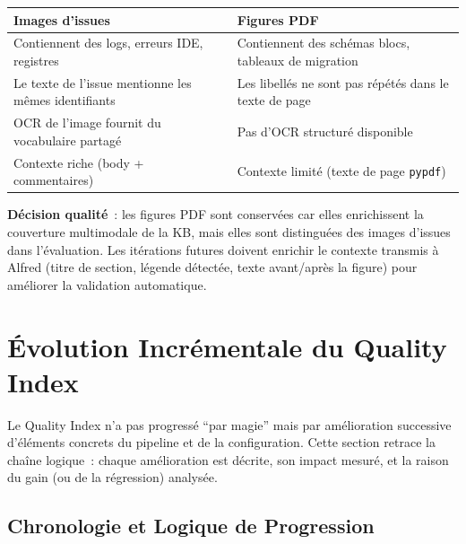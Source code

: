 \begin{longtable}{p{5.5cm}p{7cm}}
\toprule
\textbf{Images d'issues} & \textbf{Figures PDF} \\
\midrule
Contiennent des logs, erreurs IDE, registres & Contiennent des schémas blocs, tableaux de migration \\
Le texte de l'issue mentionne les mêmes identifiants & Les libellés ne sont pas répétés dans le texte de page \\
OCR de l'image fournit du vocabulaire partagé & Pas d'OCR structuré disponible \\
Contexte riche (body + commentaires) & Contexte limité (texte de page \texttt{pypdf}) \\
\bottomrule
\end{longtable}

\textbf{Décision qualité}~: les figures PDF sont conservées car elles enrichissent la couverture multimodale de la KB, mais elles sont distinguées des images d'issues dans l'évaluation. Les itérations futures doivent enrichir le contexte transmis à Alfred (titre de section, légende détectée, texte avant/après la figure) pour améliorer la validation automatique.

\section{Évolution Incrémentale du Quality Index}
\label{sec:evolution_incrementale}

Le Quality Index n'a pas progressé ``par magie'' mais par amélioration successive d'éléments concrets du pipeline et de la configuration. Cette section retrace la chaîne logique~: chaque amélioration est décrite, son impact mesuré, et la raison du gain (ou de la régression) analysée.

\subsection{Chronologie et Logique de Progression}


